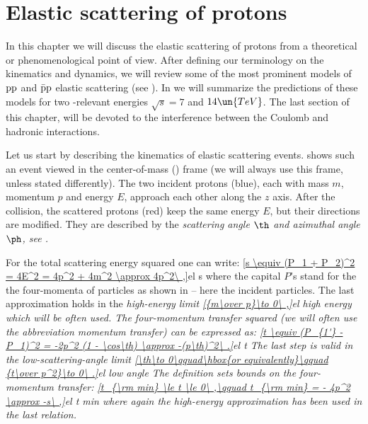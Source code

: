 \def\FC{F^{\rm C}}
\def\FH{F^{\rm H}}
\def\FCH{F^{\rm C+H}}

\def\KL{Kundr\' at-Lokaj\char237\char232 ek}
\def\KaL{Kundr\' at and Lokaj\char237\char232 ek}
\def\WY{West-Yennie}
\def\WaY{West and Yennie}


\chapter[el]{Elastic scattering of protons}

In this chapter we will discuss the elastic scattering of protons from a theoretical or phenomenological point of view. After defining our terminology on the kinematics and dynamics, we will review some of the most prominent models of $\rm pp$ and $\rm\bar pp$ elastic scattering (see ). In  we will summarize the predictions of these models for two -relevant energies $\sqrt s = 7$ and $14\un{TeV}$. The last section of this chapter,  will be devoted to the interference between the Coulomb and hadronic interactions.

Let us start by describing the kinematics of elastic scattering events.  shows such an event viewed in the center-of-mass () frame (we will always use this frame, unless stated differently). The two incident protons (blue), each with mass $m$, momentum $p$ and energy $E$, approach each other along the $z$ axis. After the collision, the scattered protons (red) keep the same energy $E$, but their directions are modified. They are described by the \em{scattering angle} $\th$ and \em{azimuthal angle} $\ph$, see .


For the total scattering energy squared one can write:
\eqref{s \equiv (P_1 + P_2)^2 = 4E^2 = 4p^2 + 4m^2 \approx 4p^2\ ,}{el s}
where the capital $P$'s stand for the the four-momenta of particles as shown in  -- here the incident particles. The last approximation holds in the \em{high-energy} limit
\eqref{{m\over p}\to 0\ ,}{el high energy}
which will be often used. The four-momentum transfer squared (we will often use the abbreviation momentum transfer) can be expressed as:
\eqref{t \equiv (P_{1'} - P_1)^2 = -2p^2 (1 - \cos\th) \approx -(p\th)^2\ .}{el t}
The last step is valid in the \em{low-scattering-angle} limit
\eqref{\th\to 0\qquad\hbox{or equivalently}\qquad {t\over p^2}\to 0\ .}{el low angle}
The definition  sets bounds on the four-momentum transfer:
\eqref{t_{\rm min} \le t \le 0\ ,\qquad t_{\rm min} = - 4p^2 \approx -s\ ,}{el t min}
where again the high-energy approximation has been used in the last relation.

